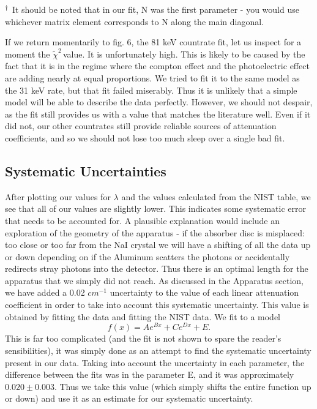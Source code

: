 \documentclass{article}
\newcommand{\redchi}{$\tilde{\chi}^2\,$}
\begin{document}
	\begin{flushleft}
	$\tiny{^\dagger}$ It should be noted that in our fit, N was the first parameter - you would use whichever matrix element corresponds to N along the main diagonal.

	\vspace{.25cm}

	If we return momentarily to fig. 6, the 81 keV countrate fit, let us inspect for a moment the \redchi value.  It is unfortunately high.  This is likely to be caused by the fact that it is in the regime where the compton effect and the photoelectric effect are adding nearly at equal proportions.  We tried to fit it to the same model as the 31 keV rate, but that fit failed miserably.  Thus it is unlikely that a simple model will be able to describe the data perfectly.  However, we should not despair, as the fit still provides us with a value that matches the literature well.  Even if it did not, our other countrates still provide reliable sources of attenuation coefficients, and so we should not lose too much sleep over a single bad fit.
	\end{flushleft}

	\subsection{Systematic Uncertainties}
	After plotting our values for $\lambda$ and the values calculated from the NIST table, we see that all of our values are slightly lower.  This indicates some systematic error that needs to be accounted for.  A plausible explanation would include an exploration of the geometry of the apparatus - if the absorber disc is misplaced: too close or too far from the NaI crystal we will have a shifting of all the data up or down depending on if the Aluminum scatters the photons or accidentally redirects stray photons into the detector.  Thus there is an optimal length for the apparatus that we simply did not reach.  As discussed in the Apparatus section, we have added a 0.02 $cm^{-1}$ uncertainty to the value of each linear attenuation coefficient in order to take into account this systematic uncertainty.  This value is obtained by fitting the data and fitting the NIST data.  We fit to a model 
	\begin{equation*}
		f(x) = Ae^{Bx} + Ce^{Dx} + E.
	\end{equation*}
	This is far too complicated (and the fit is not shown to spare the reader's sensibilities), it was simply done as an attempt to find the systematic uncertainty present in our data.  Taking into account the uncertainty in each parameter, the difference between the fits was in the parameter E, and it was approximately $0.020 \pm 0.003$.  Thus we take this value (which simply shifts the entire function up or down) and use it as an estimate for our systematic uncertainty.
\end{document}
